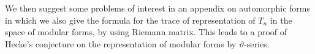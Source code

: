 We then suggest some problems of interest in an appendix on
automorphic forms in which we also give the formula for the trace of
representation of $T_n$ in the space of modular forms, by using
Riemann matrix. This leads to a proof of Hecke's conjecture on the
representation of modular forms by $\vartheta$-series. 
